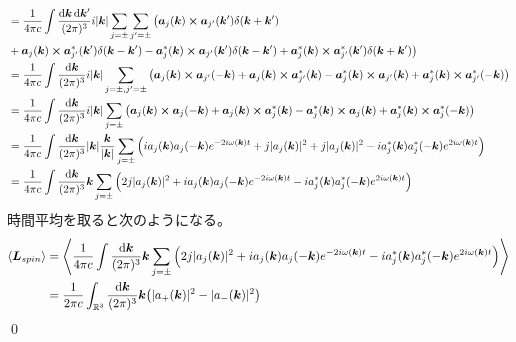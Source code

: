 \documentclass[uplatex,dvipdfmx,a4paper,11pt]{jlreq}
\makeatletter
\newcommand{\RR}{\mathbb{R}}
\newcommand{\kk}{\bm{k}}
\newcommand{\LL}{\bm{L}}
\theoremstyle{definition}
\renewenvironment{proof}[1][\proofname]{\par
  \normalfont
  \topsep6\p@\@plus6\p@ \trivlist
  \item[\hskip\labelsep{\bfseries #1}\@addpunct{\bfseries}]\ignorespaces\quad\par
}{%
  \qed\endtrivlist\@endpefalse
}
\renewcommand\proofname{証明}
\makeatother
\begin{document}
\begin{proof}
\begin{align}
     & = \frac{1}{4\pi c}\int\frac{\dd{\kk}\dd{\kk'}}{(2\pi)^3}i|\kk|\sum_{j=\pm}\sum_{j'=\pm}\big(\bm{a}_j(\kk)\cross\bm{a}_{j'}(\kk')\delta(\kk + \kk')                                                                                                                                                                       \\
     & + \bm{a}_j(\kk)\cross\bm{a}_{j'}^*(\kk')\delta(\kk - \kk') - \bm{a}_j^*(\kk)\cross\bm{a}_{j'}(\kk')\delta(\kk - \kk') + \bm{a}_j^*(\kk)\cross\bm{a}_{j'}^*(\kk')\delta(\kk + \kk')\big)                                                                                                                                  \\
     & = \frac{1}{4\pi c}\int\frac{\dd{\kk}}{(2\pi)^3}i|\kk|\sum_{j=\pm, j'=\pm}\qty(\bm{a}_j(\kk)\cross\bm{a}_{j'}(-\kk) + \bm{a}_j(\kk)\cross\bm{a}_{j'}^*(\kk) - \bm{a}_j^*(\kk)\cross\bm{a}_{j'}(\kk) + \bm{a}_j^*(\kk)\cross\bm{a}_{j'}^*(-\kk))                                                                           \\
     & = \frac{1}{4\pi c}\int\frac{\dd{\kk}}{(2\pi)^3}i|\kk|\sum_{j=\pm}\qty(\bm{a}_j(\kk)\cross\bm{a}_j(-\kk) + \bm{a}_j(\kk)\cross\bm{a}_j^*(\kk) - \bm{a}_j^*(\kk)\cross\bm{a}_j(\kk) + \bm{a}_j^*(\kk)\cross\bm{a}_j^*(-\kk))                                                                                               \\
     & = \frac{1}{4\pi c}\int\frac{\dd{\kk}}{(2\pi)^3}|\kk|\frac{\kk}{|\kk|}\sum_{j=\pm}\qty(ia_j(\kk)a_j(-\kk)e^{-2i\omega(\kk)t} + j|a_j(\kk)|^2 + j|a_j(\kk)|^2 - ia_j^*(\kk)a_j^*(-\kk)e^{2i\omega(\kk)t})                                                                                                                  \\
     & = \frac{1}{4\pi c}\int\frac{\dd{\kk}}{(2\pi)^3}\kk\sum_{j=\pm}\qty(2j|a_j(\kk)|^2 + ia_j(\kk)a_j(-\kk)e^{-2i\omega(\kk)t} - ia_j^*(\kk)a_j^*(-\kk)e^{2i\omega(\kk)t})
  \end{align}
  時間平均を取ると次のようになる。
  \begin{align}
    \ev{\LL_{spin}} & = \ev{\frac{1}{4\pi c}\int\frac{\dd{\kk}}{(2\pi)^3}\kk\sum_{j=\pm}\qty(2j|a_j(\kk)|^2 + ia_j(\kk)a_j(-\kk)e^{-2i\omega(\kk)t} - ia_j^*(\kk)a_j^*(-\kk)e^{2i\omega(\kk)t})} \\
                    & = \frac{1}{2\pi c}\int_{\RR^3}\frac{\dd{\kk}}{(2\pi)^3}\kk\qty(|a_+(\kk)|^2 - |a_-(\kk)|^2)
  \end{align}
\end{proof}
\end{document}
